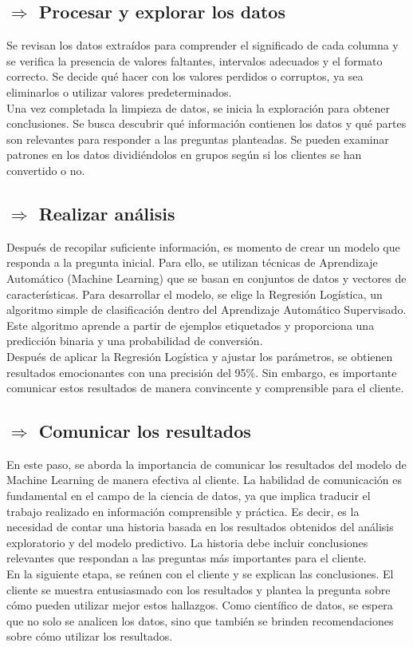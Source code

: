 \subsection*{$\Rightarrow$ Procesar y explorar los datos}
\noindent Se revisan los datos extraídos para comprender el significado de cada columna y se verifica la presencia de valores faltantes, intervalos adecuados y el formato correcto. Se decide qué hacer con los valores perdidos o corruptos, ya sea eliminarlos o utilizar valores predeterminados.\\
Una vez completada la limpieza de datos, se inicia la exploración para obtener conclusiones. Se busca descubrir qué información contienen los datos y qué partes son relevantes para responder a las preguntas planteadas. Se pueden examinar patrones en los datos dividiéndolos en grupos según si los clientes se han convertido o no.

\subsection*{$\Rightarrow$ Realizar análisis}
\noindent Después de recopilar suficiente información, es momento de crear un modelo que responda a la pregunta inicial. Para ello, se utilizan técnicas de Aprendizaje Automático (Machine Learning) que se basan en conjuntos de datos y vectores de características. Para desarrollar el modelo, se elige la Regresión Logística, un algoritmo simple de clasificación dentro del Aprendizaje Automático Supervisado. Este algoritmo aprende a partir de ejemplos etiquetados y proporciona una predicción binaria y una probabilidad de conversión.\\
Después de aplicar la Regresión Logística y ajustar los parámetros, se obtienen resultados emocionantes con una precisión del 95\%. Sin embargo, es importante comunicar estos resultados de manera convincente y comprensible para el cliente.

\subsection*{$\Rightarrow$ Comunicar los resultados}
\noindent En este paso, se aborda la importancia de comunicar los resultados del modelo de Machine Learning de manera efectiva al cliente. La habilidad de comunicación es fundamental en el campo de la ciencia de datos, ya que implica traducir el trabajo realizado en información comprensible y práctica. Es decir, es la necesidad de contar una historia basada en los resultados obtenidos del análisis exploratorio y del modelo predictivo. La historia debe incluir conclusiones relevantes que respondan a las preguntas más importantes para el cliente.\\
En la siguiente etapa, se reúnen con el cliente y se explican las conclusiones. El cliente se muestra entusiasmado con los resultados y plantea la pregunta sobre cómo pueden utilizar mejor estos hallazgos. Como científico de datos, se espera que no solo se analicen los datos, sino que también se brinden recomendaciones sobre cómo utilizar los resultados.
